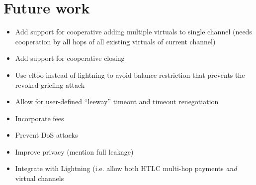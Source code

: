 \section{Future work}
  \begin{itemize}
    \item Add support for cooperative adding multiple virtuals to single channel
    (needs cooperation by all hops of all existing virtuals of current channel)
    \item Add support for cooperative closing
    \item Use eltoo instead of lightning to avoid balance restriction that
    prevents the revoked-griefing attack
    \item Allow for user-defined ``leeway'' timeout and timeout renegotiation
    \item Incorporate fees
    \item Prevent DoS attacks
    \item Improve privacy (mention full \fchan leakage)
    \item Integrate with Lightning (i.e. allow both HTLC multi-hop payments
    \emph{and} virtual channels
  \end{itemize}
